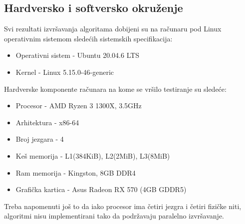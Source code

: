 \documentclass[12pt,oneside]{memoir}
\begin{document}
\subsection{Hardversko i softversko okruženje}
\label{sec:hardSoft}
Svi rezultati izvršavanja algoritama dobijeni su na računaru pod Linux operativnim sistemom
sledećih sistemskih specifikacija:
\begin{itemize}
  \item Operativni sistem - Ubuntu 20.04.6 LTS
  \item Kernel - Linux 5.15.0-46-generic
\end{itemize}
Hardverske komponente računara na kome se vršilo testiranje su sledeće:
\begin{itemize}
  \item Procesor - AMD Ryzen 3 1300X, 3.5GHz
  \item Arhitektura - x86-64
  \item Broj jezgara - 4
  \item Keš memorija - L1(384KiB), L2(2MiB), L3(8MiB)
  \item Ram memorija - Kingston, 8GB DDR4
  \item Grafička kartica - Asus Radeon RX 570 (4GB GDDR5)
\end{itemize}
Treba napomenuti još to da iako procesor ima četiri jezgra i četiri
fizičke niti, algoritmi nisu implementirani tako da podržavaju paralelno izvršavanje.
\end{document}
